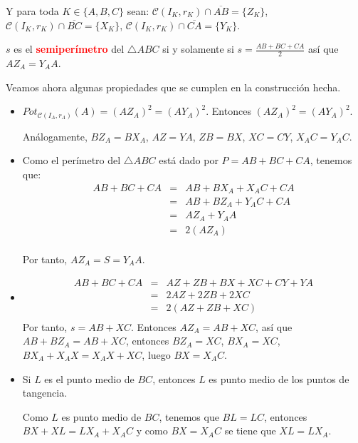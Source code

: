 Y para toda $K\in\{A,B,C\}$ sean:
$\mathcal{C}(I_{K},r_{K})\cap\overline{AB}=\{Z_{K}\}$, $\mathcal{C}(I_{K},r_{K})\cap\overline{BC}=\{X_{K}\}$, $\mathcal{C}(I_{K},r_{K})\cap\overline{CA}=\{Y_{K}\}$.
\begin{df}
$s$ es el \textcolor{red}{\bf semiperímetro} del  $\triangle ABC$ si y solamente si $s=\frac{AB+BC+CA}{2}$ así que $AZ_{A}=Y_{A}A$. 
\end{df}
Veamos ahora algunas propiedades que se cumplen en la construcción hecha. 
\begin{itemize}
\item $Pot_{\mathcal{C}(I_{A},r_{A})}(A)=(AZ_{A})^{2}=(AY_{A})^{2}$. Entonces $(AZ_{A})^{2}=(AY_{A})^{2}$.

Análogamente, $BZ_{A}=BX_{A}$, $AZ=YA$, $ZB=BX$, $XC=CY$, $X_{A}C=Y_{A}C$. 
\item Como el perímetro del $\triangle ABC$ está dado por $P=AB+BC+CA$, tenemos que:
\begin{eqnarray*}
AB+BC+CA
&=& AB+BX_{A}+X_{A}C+CA\\
&=& AB+BZ_{A}+Y_{A}C+CA\\
&=& AZ_{A}+Y_{A}A\\
&=& 2(AZ_{A})\\
\end{eqnarray*}

Por tanto, $AZ_{A}=S=Y_{A}A$.
\item 
\begin{eqnarray*}
AB+BC+CA
&=& AZ+ZB+BX+XC+CY+YA\\
&=& 2AZ+2ZB+2XC\\
&=& 2(AZ+ZB+XC)\\
\end{eqnarray*}
Por tanto, $s=AB+XC$. Entonces $AZ_{A}=AB+XC$, así que $AB+BZ_{A}=AB+XC$, entonces $BZ_{A}=XC$, $BX_{A}=XC$, $BX_{A}+X_{A}X=X_{A}X+XC$, luego $BX=X_{A}C$. 

\item Si $L$ es el punto medio de $BC$, entonces $L$ es punto medio de los puntos de tangencia. 

Como $L$ es punto medio de $BC$, tenemos que $BL=LC$, entonces $BX+XL=LX_{A}+X_{A}C$ y como $BX=X_{A}C$ se tiene que $XL=LX_{A}$. 


\end{itemize}
